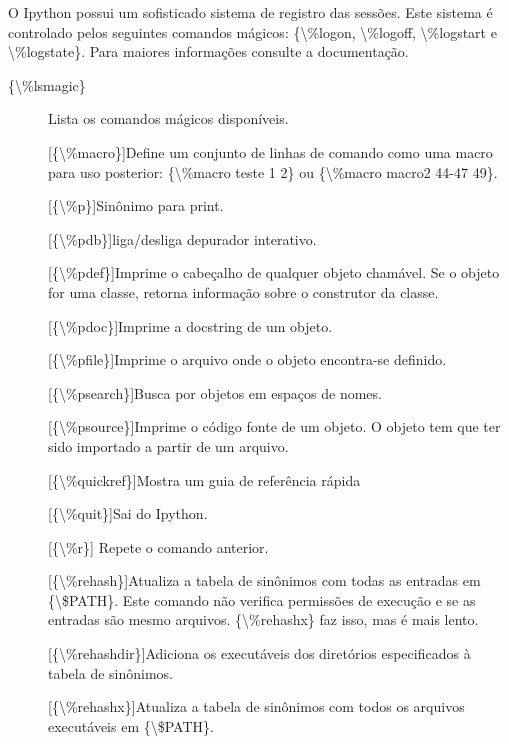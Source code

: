 \documentclass[a4paper,10pt,portuguese]{sphinxmanual}
\begin{document}
O Ipython possui um sofisticado sistema de registro das sessões.
Este sistema é controlado pelos seguintes comandos mágicos:
\{\textbackslash{}\%logon, \textbackslash{}\%logoff, \textbackslash{}\%logstart e \textbackslash{}\%logstate\}. Para maiores
informações consulte a documentação.
\begin{description}
\item[{\{\textbackslash{}\%lsmagic\}}] \leavevmode
Lista os comandos mágicos disponíveis.

{[}\{\textbackslash{}\%macro\}{]}Define um conjunto de linhas de comando como uma macro
para uso posterior: \{\textbackslash{}\%macro teste 1 2\} ou
\{\textbackslash{}\%macro macro2 44-47 49\}.

{[}\{\textbackslash{}\%p\}{]}Sinônimo para print.

{[}\{\textbackslash{}\%pdb\}{]}liga/desliga depurador interativo.

{[}\{\textbackslash{}\%pdef\}{]}Imprime o cabeçalho de qualquer objeto chamável. Se o
objeto for uma classe, retorna informação sobre o construtor da
classe.

{[}\{\textbackslash{}\%pdoc\}{]}Imprime a docstring de um objeto.

{[}\{\textbackslash{}\%pfile\}{]}Imprime o arquivo onde o objeto encontra-se definido.

{[}\{\textbackslash{}\%psearch\}{]}Busca por objetos em espaços de nomes.

{[}\{\textbackslash{}\%psource\}{]}Imprime o código fonte de um objeto. O objeto tem que
ter sido importado a partir de um arquivo.

{[}\{\textbackslash{}\%quickref\}{]}Mostra um guia de referência rápida

{[}\{\textbackslash{}\%quit\}{]}Sai do Ipython.

{[}\{\textbackslash{}\%r\}{]} Repete o comando anterior.

{[}\{\textbackslash{}\%rehash\}{]}Atualiza a tabela de sinônimos com todas as entradas
em \{\textbackslash{}\$PATH\}. Este comando não verifica permissões de execução e se
as entradas são mesmo arquivos. \{\textbackslash{}\%rehashx\} faz isso, mas é mais
lento.

{[}\{\textbackslash{}\%rehashdir\}{]}Adiciona os executáveis dos diretórios
especificados à tabela de sinônimos.

{[}\{\textbackslash{}\%rehashx\}{]}Atualiza a tabela de sinônimos com todos os arquivos
executáveis em \{\textbackslash{}\$PATH\}.


\end{description}
\end{document}
